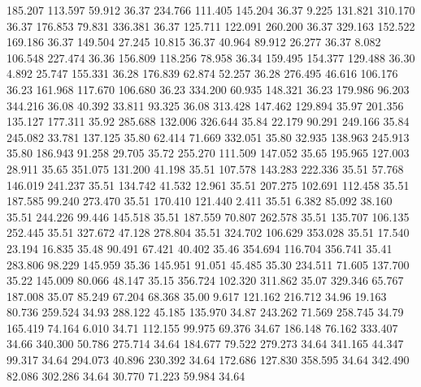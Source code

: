 185.207  113.597   59.912        36.37
 234.766  111.405  145.204        36.37
   9.225  131.821  310.170        36.37
 176.853   79.831  336.381        36.37
 125.711  122.091  260.200        36.37
 329.163  152.522  169.186        36.37
 149.504   27.245   10.815        36.37
  40.964   89.912   26.277        36.37
   8.082  106.548  227.474        36.36
 156.809  118.256   78.958        36.34
 159.495  154.377  129.488        36.30
   4.892   25.747  155.331        36.28
 176.839   62.874   52.257        36.28
 276.495   46.616  106.176        36.23
 161.968  117.670  106.680        36.23
 334.200   60.935  148.321        36.23
 179.986   96.203  344.216        36.08
  40.392   33.811   93.325        36.08
 313.428  147.462  129.894        35.97
 201.356  135.127  177.311        35.92
 285.688  132.006  326.644        35.84
  22.179   90.291  249.166        35.84
 245.082   33.781  137.125        35.80
  62.414   71.669  332.051        35.80
  32.935  138.963  245.913        35.80
 186.943   91.258   29.705        35.72
 255.270  111.509  147.052        35.65
 195.965  127.003   28.911        35.65
 351.075  131.200   41.198        35.51
 107.578  143.283  222.336        35.51
  57.768  146.019  241.237        35.51
 134.742   41.532   12.961        35.51
 207.275  102.691  112.458        35.51
 187.585   99.240  273.470        35.51
 170.410  121.440    2.411        35.51
   6.382   85.092   38.160        35.51
 244.226   99.446  145.518        35.51
 187.559   70.807  262.578        35.51
 135.707  106.135  252.445        35.51
 327.672   47.128  278.804        35.51
 324.702  106.629  353.028        35.51
  17.540   23.194   16.835        35.48
  90.491   67.421   40.402        35.46
 354.694  116.704  356.741        35.41
 283.806   98.229  145.959        35.36
 145.951   91.051   45.485        35.30
 234.511   71.605  137.700        35.22
 145.009   80.066   48.147        35.15
 356.724  102.320  311.862        35.07
 329.346   65.767  187.008        35.07
  85.249   67.204   68.368        35.00
   9.617  121.162  216.712        34.96
  19.163   80.736  259.524        34.93
 288.122   45.185  135.970        34.87
 243.262   71.569  258.745        34.79
 165.419   74.164    6.010        34.71
 112.155   99.975   69.376        34.67
 186.148   76.162  333.407        34.66
 340.300   50.786  275.714        34.64
 184.677   79.522  279.273        34.64
 341.165   44.347   99.317        34.64
 294.073   40.896  230.392        34.64
 172.686  127.830  358.595        34.64
 342.490   82.086  302.286        34.64
  30.770   71.223   59.984        34.64
